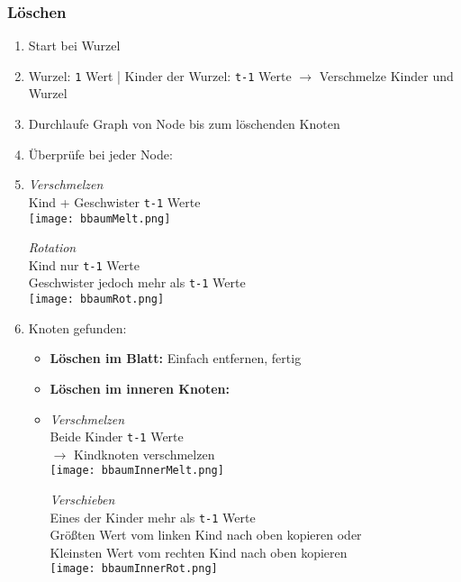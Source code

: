 \subsubsection*{Löschen}
\begin{enumerate}
    \item Start bei Wurzel
    \item[] Wurzel: \texttt{1} Wert | Kinder der Wurzel: \texttt{t-1} Werte $\rightarrow$ Verschmelze Kinder und Wurzel
    \item Durchlaufe Graph von Node bis zum löschenden Knoten
    \item Überprüfe bei jeder Node:
    \item[]
        \begin{minipage}{0.45\textwidth}
            \textit{Verschmelzen} \\
            Kind + Geschwister \texttt{t-1} Werte \\
            \texttt{[image: bbaumMelt.png]}
        \end{minipage} 
        \begin{minipage}{0.45\textwidth}
        \textit{Rotation} \\
        Kind nur \texttt{t-1} Werte \\
        Geschwister jedoch mehr als \texttt{t-1} Werte \\
        \texttt{[image: bbaumRot.png]}
        \end{minipage}
    \item Knoten gefunden:
        \begin{itemize}
            \item \textbf{Löschen im Blatt:} Einfach entfernen, fertig
            \item \textbf{Löschen im inneren Knoten:}
            \item[]
                \begin{minipage}{0.4\textwidth}
                    \textit{Verschmelzen} \\
                    Beide Kinder \texttt{t-1} Werte \\
                    $\rightarrow$ Kindknoten verschmelzen \\
                    \texttt{[image: bbaumInnerMelt.png]}
                \end{minipage} 
                \begin{minipage}{0.5\textwidth}
                \textit{Verschieben} \\
                Eines der Kinder mehr als \texttt{t-1} Werte \\
                Größten Wert vom linken Kind nach oben kopieren oder \\
                Kleinsten Wert vom rechten Kind nach oben kopieren\\
                \texttt{[image: bbaumInnerRot.png]}
                \end{minipage}
                \end{itemize}
\end{enumerate}



